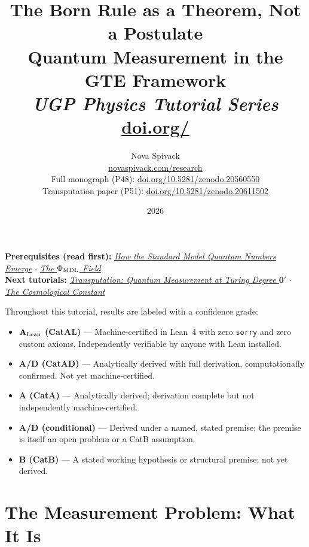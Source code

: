 \documentclass[11pt,a4paper]{article}
\title{\textbf{The Born Rule as a Theorem, Not a Postulate}\\[6pt]
\large Quantum Measurement in the GTE Framework\\[4pt]\normalsize\textit{UGP Physics Tutorial Series}
\\[2pt]\small\href{https://doi.org/\TutorialDOI}{doi.org/\TutorialDOI}}
\author{Nova Spivack\\[4pt]
\normalsize
\href{https://novaspivack.com/research}{novaspivack.com/research}\\[2pt]
\small Full monograph (P48):
\href{https://doi.org/10.5281/zenodo.20560550}{doi.org/10.5281/zenodo.20560550}\\[2pt]
\small Transputation paper (P51):
\href{https://doi.org/10.5281/zenodo.20611502}{doi.org/10.5281/zenodo.20611502}
}
\date{2026}
\begin{document}
\setcounter{tocdepth}{2}
\maketitle
\tableofcontents
\newpage

\begin{tcolorbox}[colback=blue!6,colframe=blue!40!black,
  title=\textbf{UGP Physics Tutorial Series}]
\textbf{Prerequisites (read first):} \href{https://doi.org/10.5281/zenodo.20657898}{\emph{How the Standard Model Quantum Numbers Emerge}} $\cdot$ \href{https://doi.org/10.5281/zenodo.20657885}{\emph{The $\Phi_{\rm MDL}$ Field}}\\[4pt]
\textbf{Next tutorials:} \href{https://doi.org/10.5281/zenodo.20657910}{\emph{Transputation: Quantum Measurement at Turing Degree $\mathbf{0}'$}} $\cdot$ \href{https://doi.org/10.5281/zenodo.20657864}{\emph{The Cosmological Constant}}\\[4pt]
\end{tcolorbox}

\begin{tcolorbox}[colback=boxgreen,colframe=green!50!black,
  title=\textbf{Claim-Strength Taxonomy}]
Throughout this tutorial, results are labeled with a confidence grade:
\begin{itemize}[itemsep=2pt]
  \item \textbf{$\mathbf{A}_{\rm Lean}$ (CatAL)} --- Machine-certified in Lean~4 with zero \texttt{sorry} and zero custom axioms.  Independently verifiable by anyone with Lean installed.
  \item \textbf{A/D (CatAD)} --- Analytically derived with full derivation, computationally confirmed.  Not yet machine-certified.
  \item \textbf{A (CatA)} --- Analytically derived; derivation complete but not independently machine-certified.
  \item \textbf{A/D (conditional)} --- Derived under a named, stated premise; the premise is itself an open problem or a CatB assumption.
  \item \textbf{B (CatB)} --- A stated working hypothesis or structural premise; not yet derived.
\end{itemize}
\end{tcolorbox}


\section{The Measurement Problem: What It Is}
\end{document}

